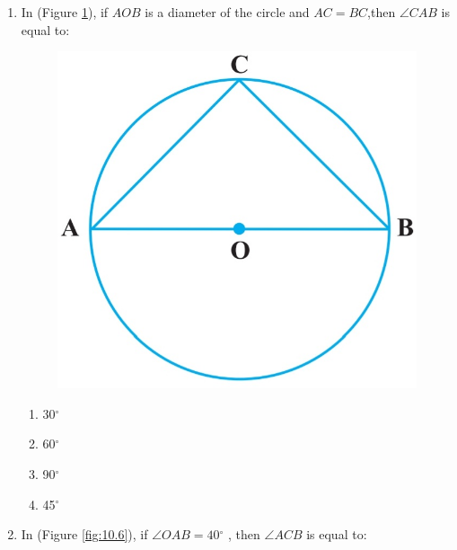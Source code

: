 \documentclass{article}
\begin{document}
\begin{enumerate}
\begin{enumerate}
\end{enumerate}
\item In (Figure \ref{fig:10.5}), if $AOB$ is a diameter of the circle and $AC = BC$,then $\angle$$CAB$ is equal to:
\begin{figure}[H]
\centering
\includegraphics[width=\columnwidth]{figs/10.5.jpg}
\caption{}
\label{fig:10.5}
\end{figure}
\begin{enumerate}
\item 30$^{\circ}$
\item 60$^{\circ}$
\item 90$^{\circ}$
\item 45$^{\circ}$
\end{enumerate}
\item In (Figure \ref{fig:10.6}), if $\angle$$OAB = 40$$^{\circ}$ , then $\angle$$ACB$ is equal to:         
\begin{figure}[H]
\centering

\end{figure}
\end{enumerate}
\end{document}
